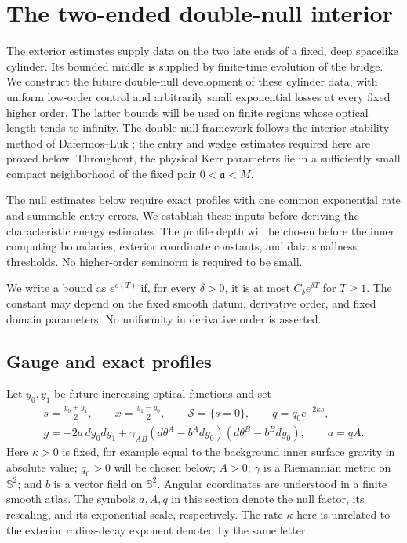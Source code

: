 \section{The two-ended double-null interior}\label{sec:interior}

The exterior estimates supply data on the two late ends of a fixed,
deep spacelike cylinder. Its bounded middle is supplied by finite-time
evolution of the bridge. We construct the future double-null development
of these cylinder data, with uniform low-order control and arbitrarily
small exponential losses at every fixed higher order. The latter bounds
will be used on finite regions whose optical length tends to infinity.
The double-null framework follows the interior-stability method of
Dafermos--Luk \cite{DafermosLuk2017}; the entry and wedge estimates
required here are proved below. Throughout, the physical Kerr parameters
lie in a sufficiently small compact neighborhood of the fixed pair
$0<\mathfrak a<M$.

The null estimates below require exact profiles with one common
exponential rate and summable entry errors. We establish these inputs
before deriving the characteristic energy estimates. The profile depth will be chosen before the
inner computing boundaries, exterior coordinate constants, and data
smallness thresholds. No higher-order seminorm is required to be small.

We write a bound as $e^{o(T)}$ if, for every $\delta>0$, it is at
most $C_\delta e^{\delta T}$ for $T\ge1$. The constant may depend
on the fixed smooth datum, derivative order, and fixed domain
parameters. No uniformity in derivative order is asserted.

\subsection{Gauge and exact profiles}

Let $y_0,y_1$ be future-increasing optical functions and set
\begin{equation}\label{in:gauge}
\begin{gathered}
 s=\frac{y_0+y_1}{2},\qquad x=\frac{y_1-y_0}{2},\qquad
 \mathcal S=\{s=0\},\qquad q=q_0e^{-2\kappa s},\\
 g=-2a\,dy_0dy_1+
 \gamma_{AB}(d\theta^A-b^A dy_0)(d\theta^B-b^Bdy_0),
 \qquad a=qA.
\end{gathered}
\end{equation}
Here $\kappa>0$ is fixed, for example equal to the background inner
surface gravity in absolute value; $q_0>0$ will be chosen below;
$A>0$; $\gamma$ is a Riemannian metric on $\mathbb S^2$; and $b$ is
a vector field on $\mathbb S^2$. Angular coordinates are understood in
a finite smooth atlas. The symbols $a,A,q$ in this section denote the
null factor, its rescaling, and its exponential scale, respectively.
The rate $\kappa$ here is unrelated to the exterior radius-decay
exponent denoted by the same letter.

